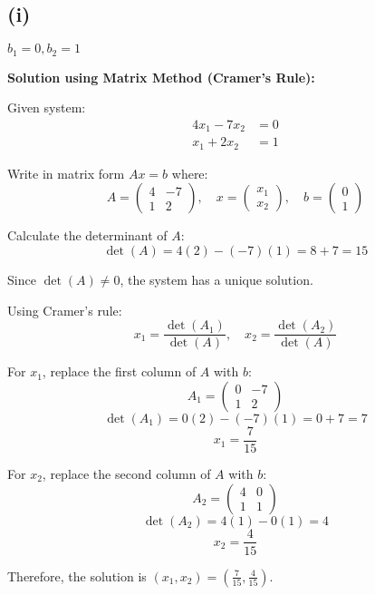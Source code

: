 \subsection*{(i)} $b_1 = 0, b_2 = 1$

\textbf{Solution using Matrix Method (Cramer's Rule):}

Given system:
\begin{align}
	4x_1 - 7x_2 & = 0 \\
	x_1 + 2x_2  & = 1
\end{align}

Write in matrix form $Ax = b$ where:
\[
	A = \begin{pmatrix}
		4 & -7 \\
		1 & 2
	\end{pmatrix}, \quad
	x = \begin{pmatrix}
		x_1 \\
		x_2
	\end{pmatrix}, \quad
	b = \begin{pmatrix}
		0 \\
		1
	\end{pmatrix}
\]

Calculate the determinant of $A$:
\[
	\det(A) = 4(2) - (-7)(1) = 8 + 7 = 15
\]

Since $\det(A) \neq 0$, the system has a unique solution.

Using Cramer's rule:
\[
	x_1 = \frac{\det(A_1)}{\det(A)}, \quad x_2 = \frac{\det(A_2)}{\det(A)}
\]

For $x_1$, replace the first column of $A$ with $b$:
\[
	A_1 = \begin{pmatrix}
		0 & -7 \\
		1 & 2
	\end{pmatrix}
\]
\[
	\det(A_1) = 0(2) - (-7)(1) = 0 + 7 = 7
\]
\[
	x_1 = \frac{7}{15}
\]

For $x_2$, replace the second column of $A$ with $b$:
\[
	A_2 = \begin{pmatrix}
		4 & 0 \\
		1 & 1
	\end{pmatrix}
\]
\[
	\det(A_2) = 4(1) - 0(1) = 4
\]
\[
	x_2 = \frac{4}{15}
\]

Therefore, the solution is $\boxed{\left(x_1, x_2\right) = \left(\frac{7}{15}, \frac{4}{15}\right)}$.